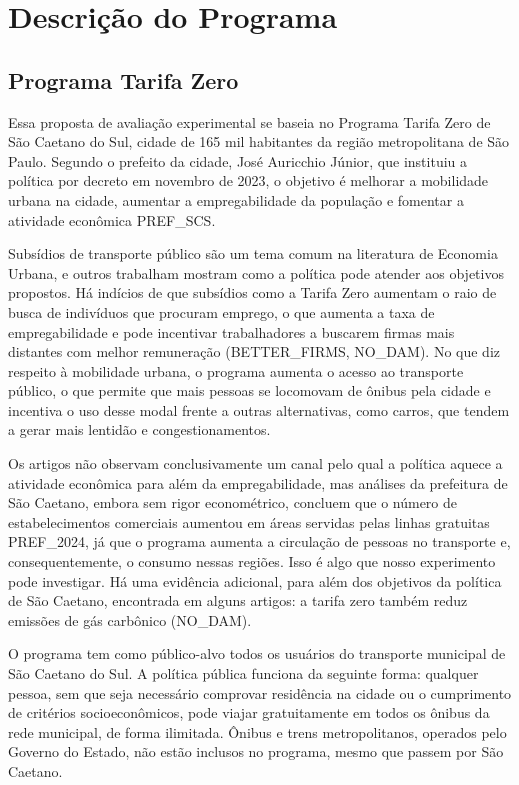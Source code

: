 
\section{Descrição do Programa}

\subsection{Programa Tarifa Zero}
Essa proposta de avaliação experimental se baseia no Programa Tarifa Zero de São Caetano do Sul, cidade de 165 mil habitantes da região metropolitana de São Paulo. Segundo o prefeito da cidade, José Auricchio Júnior, que instituiu a política por decreto em novembro de 2023, o objetivo é melhorar a mobilidade urbana na cidade, aumentar a empregabilidade da população e fomentar a atividade econômica PREF_SCS. 

Subsídios de transporte público são um tema comum na literatura de Economia Urbana, e outros trabalham mostram como a política pode atender aos objetivos propostos. Há indícios de que subsídios como a Tarifa Zero aumentam o raio de busca de indivíduos que procuram emprego, o que aumenta a taxa de empregabilidade e pode incentivar trabalhadores a buscarem firmas mais distantes com melhor remuneração (BETTER_FIRMS, NO_DAM). No que diz respeito à mobilidade urbana, o programa aumenta o acesso ao transporte público, o que permite que mais pessoas se locomovam de ônibus pela cidade e incentiva o uso desse modal frente a outras alternativas, como carros, que tendem a gerar mais lentidão e congestionamentos. 

Os artigos não observam conclusivamente um canal pelo qual a política aquece a atividade econômica para além da empregabilidade, mas análises da prefeitura de São Caetano, embora sem rigor econométrico, concluem que o número de estabelecimentos comerciais aumentou em áreas servidas pelas linhas gratuitas PREF_2024, já que o programa aumenta a circulação de pessoas no transporte e, consequentemente, o consumo nessas regiões. Isso é algo que nosso experimento pode investigar. Há uma evidência adicional, para além dos objetivos da política de São Caetano, encontrada em alguns artigos: a tarifa zero também reduz emissões de gás carbônico (NO_DAM).

O programa tem como público-alvo todos os usuários do transporte municipal de São Caetano do Sul. A política pública funciona da seguinte forma: qualquer pessoa, sem que seja necessário comprovar residência na cidade ou o cumprimento de critérios socioeconômicos, pode viajar gratuitamente em todos os ônibus da rede municipal, de forma ilimitada. Ônibus e trens metropolitanos, operados pelo Governo do Estado, não estão inclusos no programa, mesmo que passem por São Caetano.


